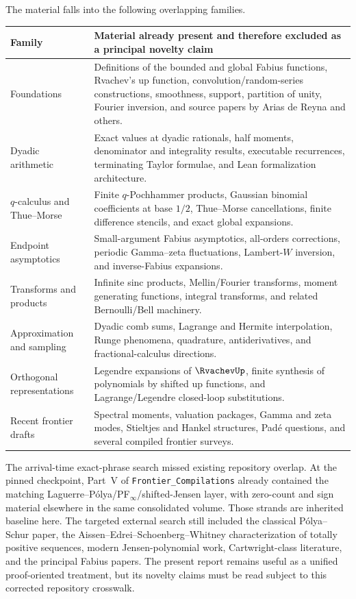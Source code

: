 \documentclass[11pt]{article}
\numberwithin{equation}{section}
\theoremstyle{definition}
\theoremstyle{remark}
\begin{document}
The material falls into the following overlapping families.
\begin{longtable}{>{\raggedright\arraybackslash}p{}>{\raggedright\arraybackslash}p{}}
\toprule
Family & Material already present and therefore excluded as a principal novelty claim \\
\midrule
\endhead
Foundations & Definitions of the bounded and global Fabius functions, Rvachev's up function, convolution/random-series constructions, smoothness, support, partition of unity, Fourier inversion, and source papers by Arias de Reyna and others.\\
Dyadic arithmetic & Exact values at dyadic rationals, half moments, denominator and integrality results, executable recurrences, terminating Taylor formulae, and Lean formalization architecture.\\
$q$-calculus and Thue--Morse & Finite $q$-Pochhammer products, Gaussian binomial coefficients at base $1/2$, Thue--Morse cancellations, finite difference stencils, and exact global expansions.\\
Endpoint asymptotics & Small-argument Fabius asymptotics, all-orders corrections, periodic Gamma--zeta fluctuations, Lambert-$W$ inversion, and inverse-Fabius expansions.\\
Transforms and products & Infinite sinc products, Mellin/Fourier transforms, moment generating functions, integral transforms, and related Bernoulli/Bell machinery.\\
Approximation and sampling & Dyadic comb sums, Lagrange and Hermite interpolation, Runge phenomena, quadrature, antiderivatives, and fractional-calculus directions.\\
Orthogonal representations & Legendre expansions of $\RvachevUp$, finite synthesis of polynomials by shifted up functions, and Lagrange/Legendre closed-loop substitutions.\\
Recent frontier drafts & Spectral moments, valuation packages, Gamma and zeta modes, Stieltjes and Hankel structures, Padé questions, and several compiled frontier surveys.\\
\bottomrule
\end{longtable}

The arrival-time exact-phrase search missed existing repository overlap.  At
the pinned checkpoint, Part~V of \texttt{Frontier\_Compilations} already
contained the matching Laguerre--P\'olya/PF$_\infty$/shifted-Jensen layer,
with zero-count and sign material elsewhere in the same consolidated volume.
Those strands are inherited baseline here.  The targeted external search
still included the classical P\'olya--Schur paper, the
Aissen--Edrei--Schoenberg--Whitney characterization of totally positive
sequences, modern Jensen-polynomial work, Cartwright-class literature, and
the principal Fabius papers.  The present report remains useful as a unified
proof-oriented treatment, but its novelty claims must be read subject to this
corrected repository crosswalk.
\end{document}

